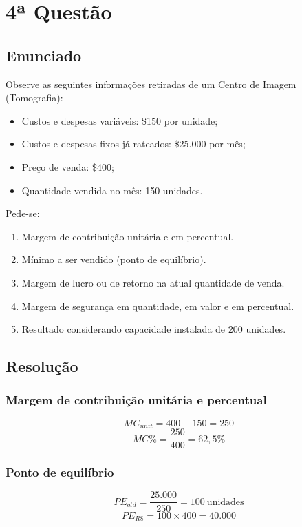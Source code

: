 \documentclass[12pt]{article}
\begin{document}
\section{4ª Questão}
\label{sec:org09c8381}

\subsection{Enunciado}
\label{sec:org10cd8cf}
Observe as seguintes informações retiradas de um Centro de Imagem (Tomografia):
\begin{itemize}
\item Custos e despesas variáveis: \$150 por unidade;
\item Custos e despesas fixos já rateados: \$25.000 por mês;
\item Preço de venda: \$400;
\item Quantidade vendida no mês: 150 unidades.
\end{itemize}

Pede-se:
\begin{enumerate}
\item Margem de contribuição unitária e em percentual.
\item Mínimo a ser vendido (ponto de equilíbrio).
\item Margem de lucro ou de retorno na atual quantidade de venda.
\item Margem de segurança em quantidade, em valor e em percentual.
\item Resultado considerando capacidade instalada de 200 unidades.
\end{enumerate}

\subsection{Resolução}
\label{sec:org2fe7e1b}

\subsubsection{Margem de contribuição unitária e percentual}
\label{sec:orgb19900a}
\[
MC_{unit} = 400 - 150 = 250
\]
\[
MC\% = \frac{250}{400} = 62{,}5\%
\]

\subsubsection{Ponto de equilíbrio}
\label{sec:orgab91349}
\[
PE_{qtd} = \frac{25.000}{250} = 100\ \text{unidades}
\]
\[
PE_{R\$} = 100 \times 400 = 40.000
\]
\end{document}
